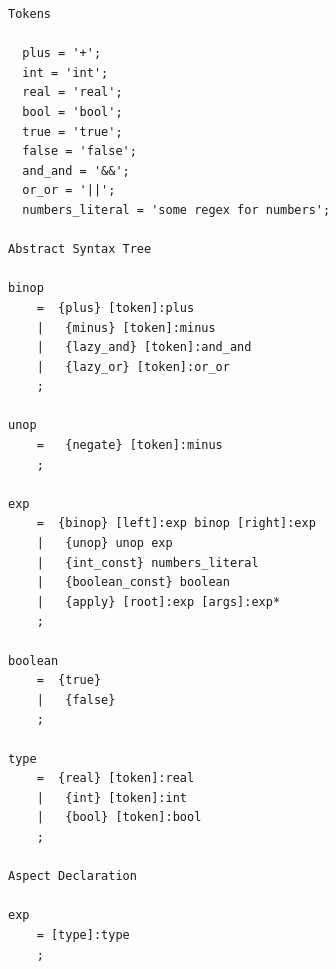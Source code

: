 \documentclass{overturerep}
\begin{document}
\begin{lstlisting}
Tokens

  plus = '+';
  int = 'int';
  real = 'real';
  bool = 'bool';
  true = 'true';
  false = 'false';
  and_and = '&&';
  or_or = '||';
  numbers_literal = 'some regex for numbers';

Abstract Syntax Tree

binop
    =  {plus} [token]:plus
    |   {minus} [token]:minus
    |   {lazy_and} [token]:and_and
    |   {lazy_or} [token]:or_or
    ;
    
unop
    =   {negate} [token]:minus
    ;
    
exp
    =  {binop} [left]:exp binop [right]:exp
    |   {unop} unop exp
    |   {int_const} numbers_literal
    |   {boolean_const} boolean
    |   {apply} [root]:exp [args]:exp*
    ;
    
boolean
    =  {true}
    |   {false}
    ;
    
type
    =  {real} [token]:real
    |   {int} [token]:int
    |   {bool} [token]:bool
    ;

Aspect Declaration

exp 
    = [type]:type
    ;
\end{lstlisting}




\end{document}
